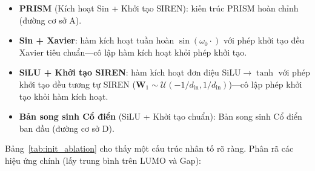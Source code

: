 \documentclass[10pt,twocolumn,letterpaper]{article}
\begin{document}
\begin{itemize}
    \item \textbf{PRISM} (Kích hoạt Sin + Khởi tạo SIREN): kiến trúc PRISM hoàn chỉnh (đường cơ sở A).
    \item \textbf{Sin + Xavier}: hàm kích hoạt tuần hoàn $\sin(\omega_0 \cdot)$ với phép khởi tạo đều Xavier tiêu chuẩn---cô lập hàm kích hoạt khỏi phép khởi tạo.
    \item \textbf{SiLU + Khởi tạo SIREN}: hàm kích hoạt đơn điệu SiLU$\to\tanh$ với phép khởi tạo đều tương tự SIREN ($\mathbf{W}_1 \sim \mathcal{U}(-1/d_{\mathrm{in}}, 1/d_{\mathrm{in}})$)---cô lập phép khởi tạo khỏi hàm kích hoạt.
    \item \textbf{Bản song sinh Cổ điển} (SiLU + Khởi tạo chuẩn): Bản song sinh Cổ điển ban đầu (đường cơ sở D).
\end{itemize}

\begin{table}[h]
\centering
\small
\caption{\textbf{Phân tích Cắt bỏ Nhân tố $2 \times 2$: Hàm kích hoạt $\times$ Khởi tạo} ($N = 1{,}000$, 10 hạt giống). MAE tập kiểm tra (eV), trung bình $\pm$ độ lệch chuẩn. Toàn bộ bốn mô hình đều có chính xác $2{,}527$ tham số. Hàm kích hoạt $\sin$ tuần hoàn là yếu tố chủ đạo; phép khởi tạo SIREN đóng góp hiệu ứng cộng hưởng thứ cấp. Mọi chênh lệch theo cặp giữa PRISM và các biến thể khác đều có ý nghĩa thống kê ($p < 0.002$, Cohen's $d > 2.0$).}
\label{tab:init_ablation}
\end{table}

Bảng~\ref{tab:init_ablation} cho thấy một cấu trúc nhân tố rõ ràng. Phân rã các hiệu ứng chính (lấy trung bình trên LUMO và Gap):
\end{document}
